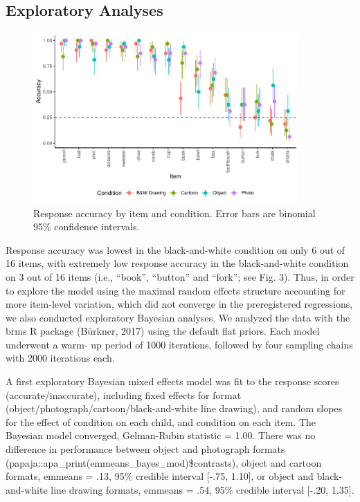 \documentclass[10pt, letterpaper]{article}
\begin{document}
\subsection{Exploratory Analyses}\label{exploratory-analyses}

\begin{CodeChunk}
\begin{figure}[tb]

{\centering \includegraphics[width=4in]{figs/fig3-1} 

}

\caption[Response accuracy by item and condition]{Response accuracy by item and condition. Error bars are binomial 95\% confidence intervals.}\label{fig:fig3}
\end{figure}
\end{CodeChunk}

Response accuracy was lowest in the black-and-white condition on only 6
out of 16 items, with extremely low response accuracy in the
black-and-white condition on 3 out of 16 items (i.e., ``book'',
``button'' and ``fork''; see Fig. 3). Thus, in order to explore the
model using the maximal random effects structure accounting for more
item-level variation, which did not converge in the preregistered
regressions, we also conducted exploratory Bayesian analyses. We
analyzed the data with the brms R package (Bürkner, 2017) using the
default flat priors. Each model underwent a warm- up period of 1000
iterations, followed by four sampling chains with 2000 iterations each.

A first exploratory Bayesian mixed effects model was fit to the response
scores (accurate/inaccurate), including fixed effects for format
(object/photograph/cartoon/black-and-white line drawing), and random
slopes for the effect of condition on each child, and condition on each
item. The Bayesian model converged, Gelman-Rubin statistic = 1.00. There
was no difference in performance between object and photograph formats
(papaja::apa\_print(emmeans\_bayes\_mod)\$contrasts), object and cartoon
formats, emmeans = .13, 95\% credible interval {[}-.75, 1.10{]}, or
object and black-and-white line drawing formats, emmeans = .54, 95\%
credible interval {[}-.20, 1.35{]}.
\end{document}
